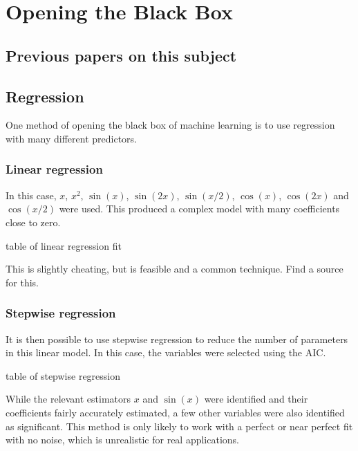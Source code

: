 
\chapter{Opening the Black Box}

\section{Previous papers on this subject}

\section{Regression}

One method of opening the black box of machine learning is to use regression with many different predictors.

\subsection{Linear regression}

In this case, \(x\), \(x^2\), \(\sin(x)\), \(\sin(2x)\), \(\sin(x/2)\), \(\cos(x)\), \(\cos(2x)\) and \(\cos(x/2)\) were used.
This produced a complex model with many coefficients close to zero.

\begin{todo}
	table of linear regression fit
\end{todo}

\begin{todo}
	This is slightly cheating, but is feasible and a common technique. Find a source for this.
\end{todo}

\subsection{Stepwise regression}

It is then possible to use stepwise regression to reduce the number of parameters in this linear model.
In this case, the variables were selected using the \ac{AIC}.

\begin{todo}
	table of stepwise regression
\end{todo}

While the relevant estimators \(x\) and \(\sin(x)\) were identified and their coefficients fairly accurately estimated, a few other variables were also identified as significant.
This method is only likely to work with a perfect or near perfect fit with no noise, which is unrealistic for real applications.

